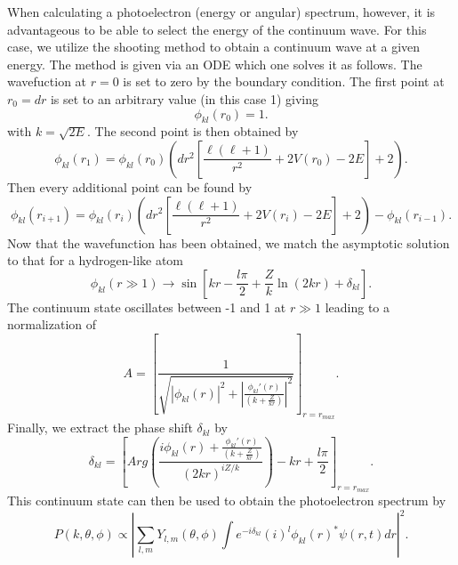 When calculating a photoelectron (energy or angular) spectrum, however, it is advantageous to be able to select the energy of the continuum wave. For this case, we utilize the shooting method to obtain a continuum wave at a given energy. The method is given via an ODE which one solves it as follows. The wavefuction at $r=0$ is set to zero by the boundary condition. The first point at $r_0=dr$ is set to an arbitrary value (in this case 1) giving 
\begin{equation}
    \phi_{kl}(r_0) = 1.
\end{equation}
with $k=\sqrt{2E}$. The second point is then obtained by
\begin{equation}
    \phi_{kl}(r_1) = \phi_{kl}(r_0) \left(dr^2\left[\frac{\ell (\ell+1)}{r^2} + 2V(r_0) -2 E\right]+2 \right). 
\end{equation}
Then every additional point can be found by 
\begin{equation}
    \phi_{kl}(r_{i+1}) = \phi_{kl}(r_i) \left(dr^2\left[\frac{\ell (\ell+1)}{r^2} + 2V(r_i) -2 E\right]+2 \right) - \phi_{kl}(r_{i-1}).
\end{equation}
Now that the wavefunction has been obtained, we match the asymptotic solution to that for a hydrogen-like atom
\begin{equation}
  \phi_{kl}(r\gg1) \rightarrow \sin\left[kr - \frac{l\pi}{2} +\frac{Z}{k} \ln(2kr) + \delta_{kl} \right].
\end{equation}
The continuum state oscillates between -1 and 1 at $r\gg1$ leading to a normalization of
\begin{equation}
  A = \left[\frac{1}{\sqrt{|\phi_{kl}(r)|^2 + \left|\frac{\phi_{kl}'(r)}{(k+\frac{Z}{kr})}\right|^2}} \right]_{r=r_{max}}.
\end{equation}
Finally, we extract the phase shift $\delta_{kl}$ by
\begin{equation}
    \delta_{kl} = \left[Arg\left(\frac{i\phi_{kl}(r) + \frac{\phi_{kl}'(r)}{(k+\frac{Z}{kr})} }{(2kr)^{iZ/k}}\right) - kr + \frac{l\pi}{2} \right]_{r=r_{max}}.
\end{equation}
This continuum state can then be used to obtain the photoelectron spectrum by 
\begin{equation}
    P(k,\theta,\phi) \propto \left|\sum_{l,m} Y_{l,m}(\theta,\phi)\int  e^{-i\delta_{kl}}(i)^l \phi_{kl}(r)^* \psi(r,t) dr \right|^2.
\end{equation}

